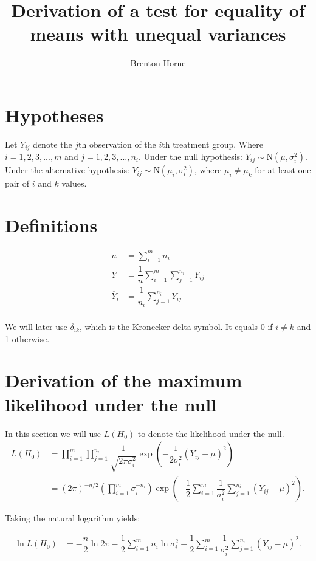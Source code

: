 \documentclass[12pt,a4paper]{article}
\title{Derivation of a test for equality of means with unequal variances}
\author{Brenton Horne}
\begin{document}
	\maketitle
	
	\tableofcontents
	
	\newpage
	
	\section{Hypotheses}
	Let $Y_{ij}$ denote the $j$th observation of the $i$th treatment group. Where $i=1, 2, 3, ..., m$ and $j=1, 2, 3, ..., n_i$. Under the null hypothesis: $Y_{ij} \sim \mathrm{N}(\mu, \sigma_i^2)$. Under the alternative hypothesis: $Y_{ij} \sim \mathrm{N}(\mu_i, \sigma_i^2)$, where $\mu_i \neq \mu_k$ for at least one pair of $i$ and $k$ values.
	
	\section{Definitions}
	\begin{align*}
	n &= \sum_{i=1}^m n_i \\
	\overline{Y} &= \dfrac{1}{n} \sum_{i=1}^m \sum_{j=1}^{n_i} Y_{ij} \\
	\overline{Y}_i &= \dfrac{1}{n_i} \sum_{j=1}^{n_i} Y_{ij} \\
	\end{align*}

	We will later use $\delta_{ik}$, which is the Kronecker delta symbol. It equals 0 if $i\neq k$ and 1 otherwise.
	
	\section{Derivation of the maximum likelihood under the null}
	In this section we will use $L(H_0)$ to denote the likelihood under the null.
	\begin{align}
		L(H_0) &= \prod_{i=1}^m \prod_{j=1}^{n_i} \dfrac{1}{\sqrt{2\pi \sigma^2_i}} \exp\left(-\dfrac{1}{2\sigma^2_i}(Y_{ij}-\mu)^2\right) \nonumber\\
		&= (2\pi)^{-n/2} \left(\prod_{i=1}^m \sigma_i^{-n_i}\right)\exp\left(-\dfrac{1}{2} \sum_{i=1}^m \dfrac{1}{\sigma_i^2}\sum_{j=1}^{n_i}(Y_{ij}-\mu)^2 \right). \label{LH0}
	\end{align}

	Taking the natural logarithm yields:
	
	\begin{align*}
		\ln{L(H_0)} &= -\dfrac{n}{2}\ln{2\pi} - \dfrac{1}{2}\sum_{i=1}^m n_i \ln{\sigma^2_i} - \dfrac{1}{2} \sum_{i=1}^m \dfrac{1}{\sigma^2_i}\sum_{j=1}^{n_i} (Y_{ij}-\mu)^2.
	\end{align*}
\end{document}

